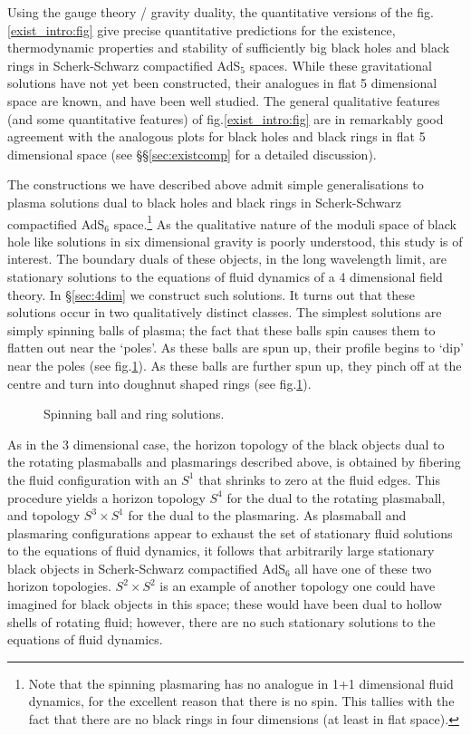 Using the gauge theory / gravity duality, the quantitative versions
of the fig.\ref{exist_intro:fig} give precise quantitative
predictions for the existence, thermodynamic properties and
stability of sufficiently big  black holes and black rings in
Scherk-Schwarz compactified AdS$_5$ spaces. While these
gravitational solutions have not yet been constructed, their
analogues in flat 5 dimensional space are known, and have been well
studied. The general qualitative features (and some quantitative
features) of fig.\ref{exist_intro:fig} are in remarkably good
agreement with the analogous plots for black holes and black rings
in flat 5 dimensional space (see \S\S\ref{sec:existcomp} for a
detailed discussion).

The constructions we have described above admit simple
generalisations to plasma solutions dual to black holes and black
rings in Scherk-Schwarz compactified AdS$_6$ space.\footnote{Note
that the spinning plasmaring has no analogue in 1+1 dimensional
fluid dynamics, for the excellent reason that there is no spin. This
tallies with the fact that there are no black rings in four
dimensions (at least in flat space).} As the qualitative nature of
the moduli space of black hole like solutions in six dimensional
gravity is poorly understood, this study is of interest. The
boundary duals of these objects, in the long wavelength limit, are
stationary solutions to the equations of fluid dynamics of a 4
dimensional field theory. In \S\ref{sec:4dim} we construct such
solutions. It turns out that these solutions occur in two
qualitatively distinct classes. The simplest solutions are simply
spinning balls of plasma; the fact that these balls spin causes them
to flatten out near the `poles'. As these balls are spun up, their
profile begins to `dip' near the poles (see fig.\ref{4d:fig}). As
these balls are further spun up, they pinch off at the centre and
turn into doughnut shaped rings (see fig.\ref{4d:fig}).

\begin{figure}
%
\begin{center}
  
  
  
  \caption{Spinning ball and ring solutions.}\label{4d:fig}
\end{center}
%
\end{figure}

As in the 3 dimensional case, the horizon topology of the black
objects dual to the rotating plasmaballs and plasmarings described
above, is obtained by fibering the fluid configuration with an $S^1$
that shrinks to zero at the fluid edges. This procedure yields a
horizon topology $S^4$ for the dual to the rotating plasmaball, and
topology $S^3\times S^1$ for the dual to the plasmaring. As
plasmaball and plasmaring configurations appear to exhaust the set
of stationary fluid solutions to the equations of fluid dynamics, it
follows that arbitrarily large stationary black objects in
Scherk-Schwarz compactified AdS$_6$ all have one of these two
horizon topologies. $S^2 \times S^2$ is an example of another
topology one could have imagined for black objects in this space;
these would have been dual to hollow shells of rotating fluid;
however, there are no such stationary solutions to the equations of
fluid dynamics.

